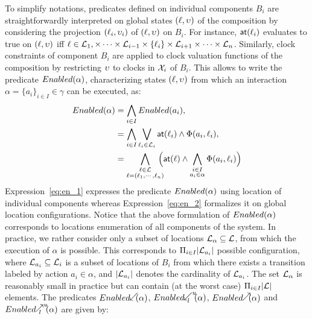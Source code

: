To simplify notations, predicates defined on individual components $B_i$ are
straightforwardly interpreted on global states $(\ell,\upsilon)$ of the composition
by considering the projection $(\ell_i,\upsilon_i)$ of $(\ell,\upsilon)$ on $B_i$.
For instance, $\textsf{at}(\ell_i)$ evaluates to true on $(\ell,\upsilon)$ iff
$\ell\in\mathcal{L}_1,\times\cdots\times\mathcal{L}_{i-1}\times\{\ell_i\}\times\mathcal{L}_{i+1}\times
\cdots\times\mathcal{L}_n$. Similarly, clock constraints of component $B_i$ are applied to clock 
valuation functions of the composition
by restricting $\upsilon$ to clocks in $\mathcal{X}_i$ of $B_i$. This allows to write
the predicate $Enabled(\alpha)$, characterizing states $(\ell,\upsilon)$ from which 
an interaction $\alpha=\{a_i\}_{i\in{I}}\in\gamma$ can be executed, as:
\begin{align}\label{eq:en}
  \enabled{\alpha}&=\bigwedge_{i\in{I}}\enabled{a_i},\\
                  &=\bigwedge_{i\in{I}}\bigvee_{\loc_i\in\Loc_i}\al{\loc_i}\wedge
                  \Phi(a_i,\loc_i),\label{eq:en_1}\\
                  &=\bigwedge_{\substack{\loc\in\Loc\\ 
                  \loc=(\loc_1,\cdots,\loc_n)}}\hspace{-3mm}\Big(\al{\loc}\wedge
                  \bigwedge_{\substack{i\in I\\ a_i\in\alpha }}\Phi(a_i,\loc_i)\Big)
                  \label{eq:en_2}
\end{align}
Expression~\ref{eq:en_1} expresses the predicate $Enabled(\alpha)$ using location of individual
components whereas Expression~\ref{eq:en_2} formalizes it on global location configurations.
Notice that the above formulation of $Enabled(\alpha)$ corresponds to locations 
enumeration of all components  of the system. In practice,
we rather consider only a subset of locations $\mathcal{L}_{\alpha}\subseteq\mathcal{L}$, from
which the execution of $\alpha$ is possible. This corresponds to $\Pi_{i\in{I}}
|\mathcal{L}_{a_i}|$ possible configuration, where $\mathcal{L}_{a_i}\subseteq\mathcal{L}_i$ is a subset
of locations of $B_i$ from which there exists a transition labeled by action $a_i\in\alpha$,
and $|\mathcal{L}_{a_i}|$ denotes the cardinality of $\mathcal{L}_{a_i}$. The set $\mathcal{L}_{\alpha}$ is 
reasonably small in practice but can contain (at the worst case) $\Pi_{i\in{I}}|\mathcal{L}|$ elements.
The predicates $\enabledbackward{\alpha}$, $\enabledbackwardb{\alpha}{l}{u}$, 
$\enabledforward{\alpha}$ and $\enabledforwardb{\alpha}{l}{u}$ are given by:

